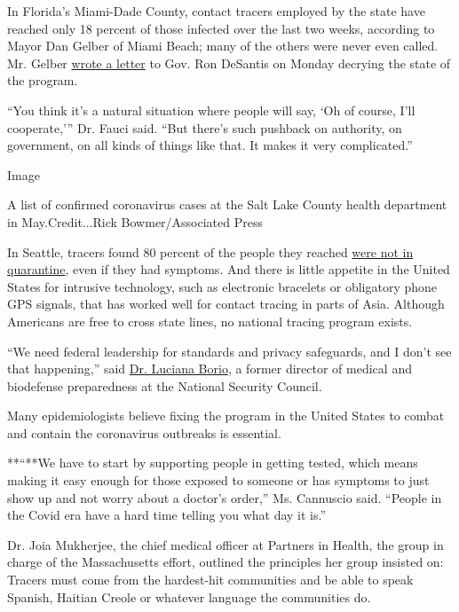 In Florida's Miami-Dade County, contact tracers employed by the state
have reached only 18 percent of those infected over the last two weeks,
according to Mayor Dan Gelber of Miami Beach; many of the others were
never even called. Mr. Gelber
\href{https://twitter.com/CBoomerVazquez/status/1287841499422629889?ref_src=twsrc\%5Etfw\%7Ctwcamp\%5Etweetembed\%7Ctwterm\%5E1287850787830468613\%7Ctwgr\%5E\&ref_url=https\%3A\%2F\%2Fwww.local10.com\%2Fnews\%2Flocal\%2F2020\%2F07\%2F27\%2Fcoronavirus-in-miami-dade-contact-tracing-failures-and-talk-of-how-to-spend-federal-money\%2F}{wrote
a letter} to Gov. Ron DeSantis on Monday decrying the state of the
program.

``You think it's a natural situation where people will say, `Oh of
course, I'll cooperate,''' Dr. Fauci said. ``But there's such pushback
on authority, on government, on all kinds of things like that. It makes
it very complicated.''

Image

A list of confirmed coronavirus cases at the Salt Lake County health
department in May.Credit...Rick Bowmer/Associated Press

In Seattle, tracers found 80 percent of the people they reached
\href{https://komonews.com/news/coronavirus/only-1-in-5-isolating-when-covid-symptoms-develop-king-county-says}{were
not in quarantine}, even if they had symptoms. And there is little
appetite in the United States for intrusive technology, such as
electronic bracelets or obligatory phone GPS signals, that has worked
well for contact tracing in parts of Asia. Although Americans are free
to cross state lines, no national tracing program exists.

``We need federal leadership for standards and privacy safeguards, and I
don't see that happening,'' said
\href{http://leighbureau.com/speakers/lborio}{Dr. Luciana Borio}, a
former director of medical and biodefense preparedness at the National
Security Council.

Many epidemiologists believe fixing the program in the United States to
combat and contain the coronavirus outbreaks is essential.

**``**We have to start by supporting people in getting tested, which
means making it easy enough for those exposed to someone or has symptoms
to just show up and not worry about a doctor's order,'' Ms. Cannuscio
said. ``People in the Covid era have a hard time telling you what day it
is.''

Dr. Joia Mukherjee, the chief medical officer at Partners in Health, the
group in charge of the Massachusetts effort, outlined the principles her
group insisted on: Tracers must come from the hardest-hit communities
and be able to speak Spanish, Haitian Creole or whatever language the
communities do.

